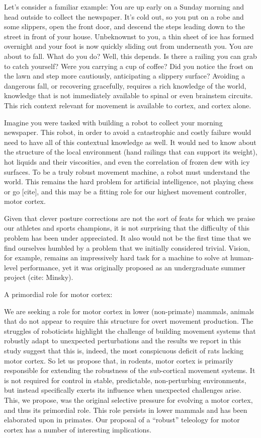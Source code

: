 Let’s consider a familiar example: You are up early on a Sunday morning and head outside to collect the newspaper. It’s cold out, so you put on a robe and some slippers, open the front door, and descend the steps leading down to the street in front of your house. Unbeknownst to you, a thin sheet of ice has formed overnight and your foot is now quickly sliding out from underneath you. You are about to fall. What do you do? Well, this depends. Is there a railing you can grab to catch yourself? Were you carrying a cup of coffee? Did you notice the frost on the lawn and step more cautiously, anticipating a slippery surface? Avoiding a dangerous fall, or recovering gracefully, requires a rich knowledge of the world, knowledge that is not immediately available to spinal or even brainstem circuits. This rich context relevant for movement is available to cortex, and cortex alone.

Imagine you were tasked with building a robot to collect your morning newspaper. This robot, in order to avoid a catastrophic and costly failure would need to have all of this contextual knowledge as well. It would ned to know about the structure of the local environment (hand railings that can support its weight), hot liquids and their viscosities, and even the correlation of frozen dew with icy surfaces. To be a truly robust movement machine, a robot must understand the world. This remains the hard problem for artificial intelligence, not playing chess or go [cite], and this may be a fitting role for our highest movement controller, motor cortex.

Given that clever posture corrections are not the sort of feats for which we praise our athletes and sports champions, it is not surprising that the difficulty of this problem has been under appreciated. It also would not be the first time that we find ourselves humbled by a problem that we initially considered trivial. Vision, for example, remains an impressively hard task for a machine to solve at human-level performance, yet it was originally proposed as an undergraduate summer project (cite: Minsky).

A primordial role for motor cortex:

We are seeking a role for motor cortex in lower (non-primate) mammals, animals that do not appear to require this structure for overt movement production. The struggles of roboticists highlight the challenge of building movement systems that robustly adapt to unexpected perturbations and the results we report in this study suggest that this is, indeed, the most conspicuous deficit of rats lacking motor cortex. So let us propose that, in rodents, motor cortex is primarily responsible for extending the robustness of the sub-cortical movement systems. It is not required for control in stable, predictable, non-perturbing environments, but instead specifically exerts its influence when unexpected challenges arise. This, we propose, was the original selective pressure for evolving a motor cortex, and thus its primordial role. This role persists in lower mammals and has been elaborated upon in primates. Our proposal of a “robust” teleology for motor cortex has a number of interesting implications.


